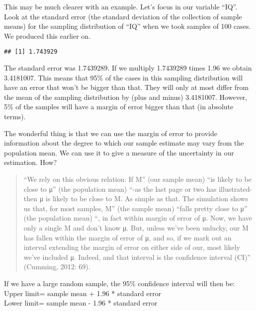 \documentclass[
]{book}
\newenvironment{Shaded}{\begin{snugshade}}{\end{snugshade}}
\newcommand{\AttributeTok}[1]{\textcolor[rgb]{0.13,0.29,0.53}{#1}}
\newcommand{\FunctionTok}[1]{\textcolor[rgb]{0.13,0.29,0.53}{\textbf{#1}}}
\newcommand{\NormalTok}[1]{#1}
\newcommand{\OtherTok}[1]{\textcolor[rgb]{0.56,0.35,0.01}{#1}}
\newcommand{\SpecialCharTok}[1]{\textcolor[rgb]{0.81,0.36,0.00}{\textbf{#1}}}
\begin{document}
This may be much clearer with an example. Let's focus in our variable ``IQ''. Look at the standard error (the standard deviation of the collection of sample means) for the sampling distribution of ``IQ'' when we took samples of 100 cases. We produced this earlier on.

\begin{Shaded}
\end{Shaded}

\begin{verbatim}
## [1] 1.743929
\end{verbatim}

The standard error was 1.7439289. If we multiply 1.7439289 times 1.96 we obtain 3.4181007. This means that 95\% of the cases in this sampling distribution will have an error that won't be bigger than that. They will only at most differ from the mean of the sampling distribution by (plus and minus) 3.4181007. However, 5\% of the samples will have a margin of error bigger than that (in absolute terms).

The wonderful thing is that we can use the margin of error to provide information about the degree to which our sample estimate may vary from the population mean. We can use it to give a measure of the uncertainty in our estimation. How?

\begin{quote}
``We rely on this obvious relation: If M'' (our sample mean) ``is likely to be close to μ'' (the population mean) ``-as the last page or two has illustrated- then μ is likely to be close to M. As simple as that. The simulation shows us that, for most samples, M'' (the sample mean) ``falls pretty close to μ'' (the population mean) ``, in fact within margin of error of μ. Now, we have only a single M and don't know μ. But, unless we've been unlucky, our M has fallen within the margin of error of μ, and so, if we mark out an interval extending the margin of error on either side of our, most likely we've included μ. Indeed, and that interval is the confidence interval (CI)'' (Cumming, 2012: 69).
\end{quote}

If we have a large random sample, the 95\% confidence interval will then be:\\
Upper limit= sample mean + 1.96 * standard error\\
Lower limit= sample mean - 1.96 * standard error
\end{document}
